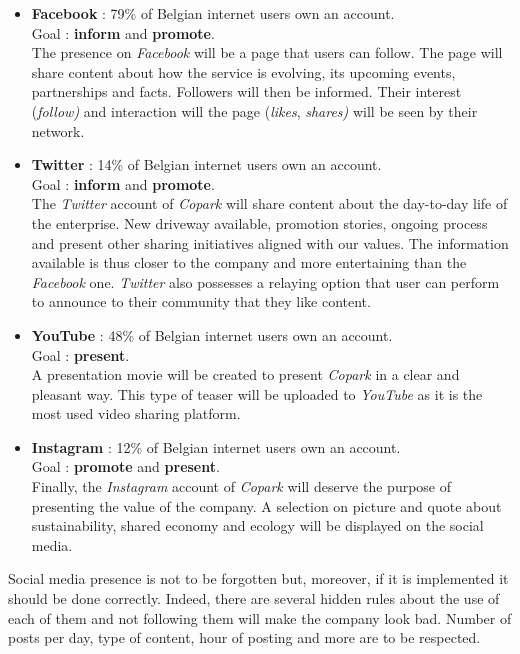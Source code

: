 \documentclass[12pt,a4paper,oneside]{book}
\newcommand{\bp}{\textit{Copark}}
\begin{document}
\begin{itemize}
\item \textbf{Facebook} : 79\% of Belgian internet users own an account.\\Goal : \textbf{inform} and \textbf{promote}.\\
The presence on \textit{Facebook} will be a page that users can follow. The page will share content about how the service is evolving, its upcoming events, partnerships and facts. Followers will then be informed. Their interest (\textit{follow)} and interaction will the page (\textit{likes}, \textit{shares)} will be seen by their network. 
\item \textbf{Twitter} : 14\% of Belgian internet users own an account.\\Goal : \textbf{inform} and \textbf{promote}.\\
The \textit{Twitter} account of \bp{} will share content about the day-to-day life of the enterprise. New driveway available, promotion stories, ongoing process and present other sharing initiatives aligned with our values. The information available is thus closer to the company and more entertaining than the \textit{Facebook} one. \textit{Twitter} also possesses a relaying option that user can perform to announce to their community that they like content.
\item \textbf{YouTube} : 48\% of Belgian internet users own an account.\\Goal : \textbf{present}.\\
A presentation movie will be created to present \bp{} in a clear and pleasant way. This type of teaser will be uploaded to \textit{YouTube} as it is the most used video sharing platform.
\item \textbf{Instagram} : 12\% of Belgian internet users own an account.\\Goal : \textbf{promote} and \textbf{present}.\\
Finally, the \textit{Instagram} account of \bp{} will deserve the purpose of presenting the value of the company. A selection on picture and quote about sustainability, shared economy and ecology will be displayed on the social media.
\end{itemize}

Social media presence is not to be forgotten but, moreover, if it is implemented it should be done correctly. Indeed, there are several hidden rules about the use of each of them and not following them will make the company look bad. Number of posts per day, type of content, hour of posting and more are to be respected.
\end{document}
